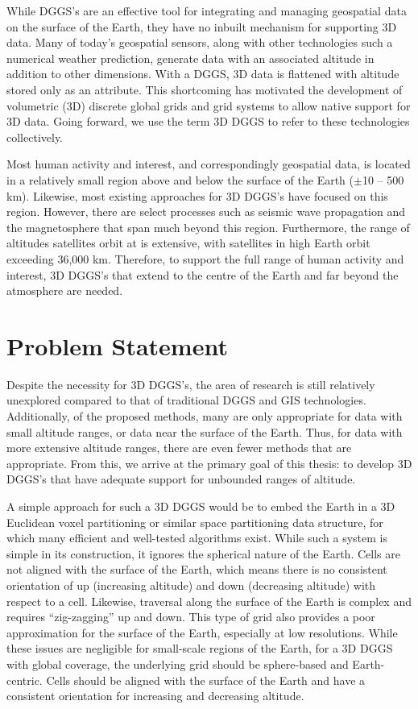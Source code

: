 While DGGS's are an effective tool for integrating and managing geospatial data on the surface of the Earth, they have no inbuilt mechanism for supporting 3D data.
Many of today's geospatial sensors, along with other technologies such a numerical weather prediction, generate data with an associated altitude in addition to other dimensions.
With a DGGS, 3D data is flattened with altitude stored only as an attribute.
This shortcoming has motivated the development of volumetric (3D) discrete global grids and grid systems to allow native support for 3D data.
Going forward, we use the term 3D DGGS to refer to these technologies collectively.


Most human activity and interest, and correspondingly geospatial data, is located in a relatively small region above and below the surface of the Earth ($\pm$10 -- 500 km).
Likewise, most existing approaches for 3D DGGS's have focused on this region.
However, there are select processes such as seismic wave propagation and the magnetosphere that span much beyond this region.
Furthermore, the range of altitudes satellites orbit at is extensive, with satellites in high Earth orbit exceeding 36,000 km.
Therefore, to support the full range of human activity and interest, 3D DGGS's that extend to the centre of the Earth and far beyond the atmosphere are needed.


\section{Problem Statement} \label{chap:1:problem}
Despite the necessity for 3D DGGS's, the area of research is still relatively unexplored compared to that of traditional DGGS and GIS technologies.
Additionally, of the proposed methods, many are only appropriate for data with small altitude ranges, or data near the surface of the Earth.
Thus, for data with more extensive altitude ranges, there are even fewer methods that are appropriate. 
From this, we arrive at the primary goal of this thesis: to develop 3D DGGS's that have adequate support for unbounded ranges of altitude. 


A simple approach for such a 3D DGGS would be to embed the Earth in a 3D Euclidean voxel partitioning or similar space partitioning data structure, for which many efficient and well-tested algorithms exist.
While such a system is simple in its construction, it ignores the spherical nature of the Earth.
Cells are not aligned with the surface of the Earth, which means there is no consistent orientation of up (increasing altitude) and down (decreasing altitude) with respect to a cell.
Likewise, traversal along the surface of the Earth is complex and requires ``zig-zagging'' up and down.
This type of grid also provides a poor approximation for the surface of the Earth, especially at low resolutions.
While these issues are negligible for small-scale regions of the Earth, for a 3D DGGS with global coverage, the underlying grid should be sphere-based and Earth-centric.
Cells should be aligned with the surface of the Earth and have a consistent orientation for increasing and decreasing altitude.


